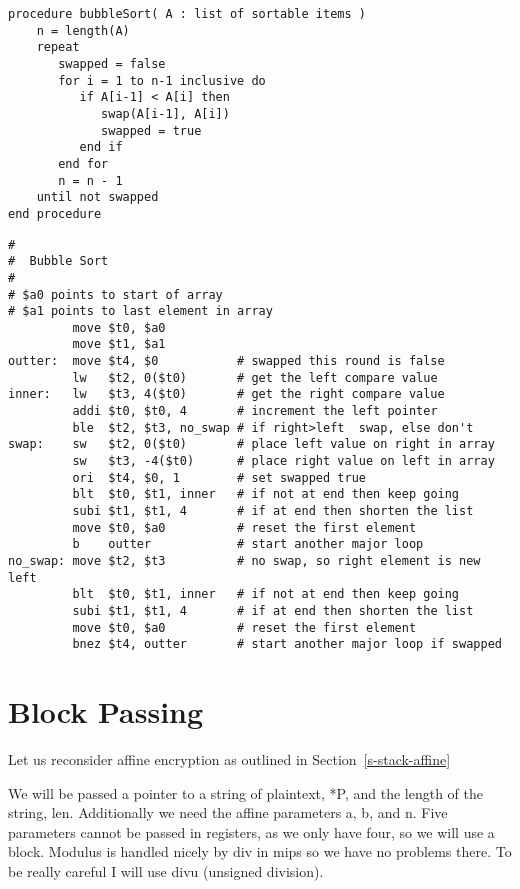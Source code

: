 \begin{verbatim}
procedure bubbleSort( A : list of sortable items )
    n = length(A)
    repeat
       swapped = false
       for i = 1 to n-1 inclusive do
          if A[i-1] < A[i] then
             swap(A[i-1], A[i])
             swapped = true
          end if
       end for
       n = n - 1
    until not swapped
end procedure
\end{verbatim}

\begin{verbatim}
#
#  Bubble Sort
#
# $a0 points to start of array
# $a1 points to last element in array
         move $t0, $a0
         move $t1, $a1
outter:  move $t4, $0           # swapped this round is false
         lw   $t2, 0($t0)       # get the left compare value
inner:   lw   $t3, 4($t0)       # get the right compare value
         addi $t0, $t0, 4       # increment the left pointer
         ble  $t2, $t3, no_swap # if right>left  swap, else don't
swap:    sw   $t2, 0($t0)       # place left value on right in array
         sw   $t3, -4($t0)      # place right value on left in array
         ori  $t4, $0, 1        # set swapped true
         blt  $t0, $t1, inner   # if not at end then keep going
         subi $t1, $t1, 4       # if at end then shorten the list
         move $t0, $a0          # reset the first element
         b    outter            # start another major loop
no_swap: move $t2, $t3          # no swap, so right element is new left
         blt  $t0, $t1, inner   # if not at end then keep going
         subi $t1, $t1, 4       # if at end then shorten the list
         move $t0, $a0          # reset the first element
         bnez $t4, outter       # start another major loop if swapped
\end{verbatim}



\section{Block Passing}

Let us reconsider affine encryption as outlined in Section~\ref{s-stack-affine}

We will be passed a pointer to a string of plaintext, *P, and the length of the string, len.  Additionally we need the affine parameters a, b, and n.  Five parameters cannot be passed in registers, as we only have four, so we will use a block.  Modulus is handled nicely by div in mips so we have no problems there.  To be really careful I will use divu (unsigned division).

